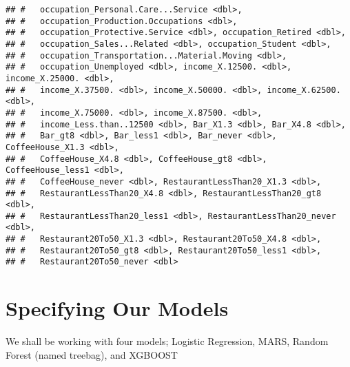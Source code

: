 \documentclass[
]{article}
\begin{document}
\begin{verbatim}
## #   occupation_Personal.Care...Service <dbl>,
## #   occupation_Production.Occupations <dbl>,
## #   occupation_Protective.Service <dbl>, occupation_Retired <dbl>,
## #   occupation_Sales...Related <dbl>, occupation_Student <dbl>,
## #   occupation_Transportation...Material.Moving <dbl>,
## #   occupation_Unemployed <dbl>, income_X.12500. <dbl>, income_X.25000. <dbl>,
## #   income_X.37500. <dbl>, income_X.50000. <dbl>, income_X.62500. <dbl>,
## #   income_X.75000. <dbl>, income_X.87500. <dbl>,
## #   income_Less.than..12500 <dbl>, Bar_X1.3 <dbl>, Bar_X4.8 <dbl>,
## #   Bar_gt8 <dbl>, Bar_less1 <dbl>, Bar_never <dbl>, CoffeeHouse_X1.3 <dbl>,
## #   CoffeeHouse_X4.8 <dbl>, CoffeeHouse_gt8 <dbl>, CoffeeHouse_less1 <dbl>,
## #   CoffeeHouse_never <dbl>, RestaurantLessThan20_X1.3 <dbl>,
## #   RestaurantLessThan20_X4.8 <dbl>, RestaurantLessThan20_gt8 <dbl>,
## #   RestaurantLessThan20_less1 <dbl>, RestaurantLessThan20_never <dbl>,
## #   Restaurant20To50_X1.3 <dbl>, Restaurant20To50_X4.8 <dbl>,
## #   Restaurant20To50_gt8 <dbl>, Restaurant20To50_less1 <dbl>,
## #   Restaurant20To50_never <dbl>
\end{verbatim}

\hypertarget{specifying-our-models}{%
\section{Specifying Our Models}\label{specifying-our-models}}

We shall be working with four models; Logistic Regression, MARS, Random
Forest (named treebag), and XGBOOST
\end{document}
